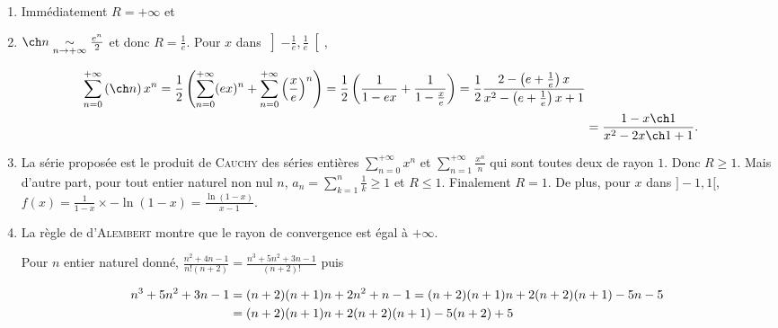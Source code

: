{{\begin{enumerate}
\item  Immédiatement $R = +\infty$ et 

\begin{center}
\end{center}

\item  $\ch n\underset{n\rightarrow+\infty}{\sim}\frac{e^n}{2}$ et donc $R=\frac{1}{e}$.
Pour $x$ dans $\left]-\frac{1}{e},\frac{1}{e}\right[$,

\begin{align*}\ensuremath 
\sum_{n=0}^{+\infty}\left(\ch n\right)x^n=\frac{1}{2}\left(\sum_{n=0}^{+\infty}(ex)^n+\sum_{n=0}^{+\infty}\left(\frac{x}{e}\right)^n\right)=\frac{1}{2}\left(\frac{1}{1-ex}+\frac{1}{1-\frac{x}{e}}\right)=\frac{1}{2}\frac{2-\left(e+\frac{1}{e}\right)x}{x^2-\left(e+\frac{1}{e}\right)x+1}\\
 &=\frac{1-x\ch1}{x^2-2x\ch1+1}.
\end{align*}

\begin{center}
\shadowbox{
$\forall x\in\left]-\frac{1}{e},\frac{1}{e}\right[$, $\sum_{n=0}^{+\infty}\left(\ch n\right)x^n=\frac{1-x\ch1}{x^2-2x\ch1+1}$.
}
\end{center}

\item  La série proposée est le produit de \textsc{Cauchy} des séries entières  $\sum_{n=0}^{+\infty}x^n$ et  $\sum_{n=1}^{+\infty}\frac{x^n}{n}$ qui sont toutes deux de rayon $1$. Donc $R\geqslant1$. Mais d'autre part, pour tout entier naturel non nul $n$, $a_n=\sum_{k=1}^{n}\frac{1}{k}\geqslant1$ et $R\leqslant1$. Finalement $R = 1$. De plus, pour $x$ dans $]-1,1[$, $f(x)=\frac{1}{1-x}\times-\ln(1-x)=\frac{\ln(1-x)}{x-1}$.

\begin{center}
\shadowbox{
$\forall x\in\left]-1,1\right[$, $\sum_{n=1}^{+\infty}\left(\sum_{k=1}^{n}\frac{1}{k}\right)x^n=\frac{\ln(1-x)}{x-1}$.
}
\end{center}

\item  La règle de d'\textsc{Alembert} montre que le rayon de convergence est égal à $+\infty$.

Pour $n$ entier naturel donné, $\frac{n^2+4n-1}{n!(n+2)}=\frac{n^3+5n^2+3n-1}{(n+2)!}$ puis 

\begin{align*}\ensuremath
n^3+5n^2+3n-1&= (n+2)(n+1)n+2n^2+n-1 = (n+2)(n+1)n+2(n+2)(n+1) - 5n - 5\\
 &= (n+2)(n+1)n + 2(n+2)(n+1) - 5(n+2) + 5
\end{align*}


\end{enumerate}}}
